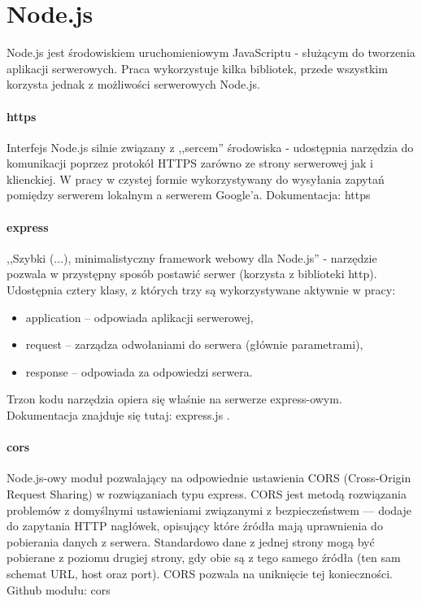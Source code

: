  
\section{Node.js}
Node.js jest środowiskiem uruchomieniowym JavaScriptu - służącym do tworzenia aplikacji serwerowych. 
Praca wykorzystuje kilka bibliotek, przede wszystkim korzysta jednak z możliwości serwerowych Node.js. 
\paragraph{https}
Interfejs Node.js silnie związany z ,,sercem'' środowiska - udostępnia narzędzia do komunikacji poprzez protokół  HTTPS zarówno ze strony serwerowej jak i klienckiej. W pracy w czystej formie wykorzystywany do wysyłania zapytań pomiędzy serwerem lokalnym a serwerem Google'a.
\newline Dokumentacja: https  \cite{https}
\paragraph{express}
,,Szybki (...), minimalistyczny framework webowy dla Node.js'' - narzędzie pozwala w przystępny sposób postawić serwer (korzysta z biblioteki http). Udostępnia cztery klasy, z których trzy są wykorzystywane aktywnie w pracy:
\begin{itemize}
\item application -- odpowiada aplikacji serwerowej,
\item  request -- zarządza odwołaniami do serwera (głównie parametrami),
\item response -- odpowiada za odpowiedzi serwera.
\end{itemize}
Trzon kodu narzędzia opiera się właśnie na serwerze express-owym.
\ind Dokumentacja znajduje się tutaj: express.js \cite{express}.
\paragraph{cors}
Node.js-owy moduł pozwalający na odpowiednie ustawienia CORS (Cross-Origin Request Sharing) w rozwiązaniach typu express. CORS jest metodą rozwiązania problemów z domyślnymi ustawieniami związanymi z bezpieczeństwem --- dodaje do zapytania HTTP nagłówek, opisujący które źródła mają uprawnienia do pobierania danych z serwera. Standardowo dane z jednej strony mogą być pobierane z poziomu drugiej strony, gdy obie są z tego samego źródła (ten sam schemat URL, host oraz port). CORS pozwala na uniknięcie tej konieczności.
\ind Github modułu: cors \cite{cors}

